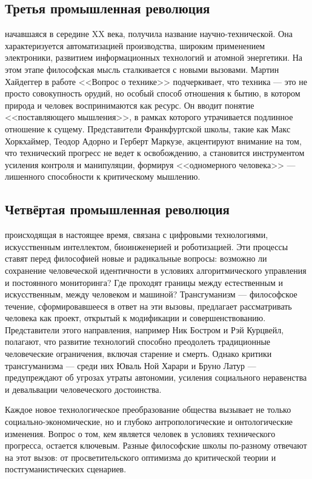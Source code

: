 \documentclass[12pt,a4paper]{article}
\begin{document}
	\subsection{Третья промышленная революция}
	начавшаяся в середине XX века, получила название научно-технической. Она характеризуется автоматизацией производства, широким применением электроники, развитием информационных технологий и атомной энергетики. На этом этапе философская мысль сталкивается с новыми вызовами. Мартин Хайдеггер в работе <<Вопрос о технике>> подчеркивает, что техника — это не просто совокупность орудий, но особый способ отношения к бытию, в котором природа и человек воспринимаются как ресурс. Он вводит понятие <<поставляющего мышления>>, в рамках которого утрачивается подлинное отношение к сущему. Представители Франкфуртской школы, такие как Макс Хоркхаймер, Теодор Адорно и Герберт Маркузе, акцентируют внимание на том, что технический прогресс не ведет к освобождению, а становится инструментом усиления контроля и манипуляции, формируя <<одномерного человека>> — лишенного способности к критическому мышлению.
	
	\subsection{Четвёртая промышленная революция}
	происходящая в настоящее время, связана с цифровыми технологиями, искусственным интеллектом, биоинженерией и роботизацией. Эти процессы ставят перед философией новые и радикальные вопросы: возможно ли сохранение человеческой идентичности в условиях алгоритмического управления и постоянного мониторинга? Где проходят границы между естественным и искусственным, между человеком и машиной? Трансгуманизм — философское течение, сформировавшееся в ответ на эти вызовы, предлагает рассматривать человека как проект, открытый к модификации и совершенствованию. Представители этого направления, например Ник Бостром и Рэй Курцвейл, полагают, что развитие технологий способно преодолеть традиционные человеческие ограничения, включая старение и смерть. Однако критики трансгуманизма — среди них Юваль Ной Харари и Бруно Латур — предупреждают об угрозах утраты автономии, усиления социального неравенства и девальвации человеческого достоинства.
	
	\par Каждое новое технологическое преобразование общества вызывает не только социально-экономические, но и глубоко антропологические и онтологические изменения. Вопрос о том, кем является человек в условиях технического прогресса, остается ключевым. Разные философские школы по-разному отвечают на этот вызов: от просветительского оптимизма до критической теории и постгуманистических сценариев.
	
\end{document}
